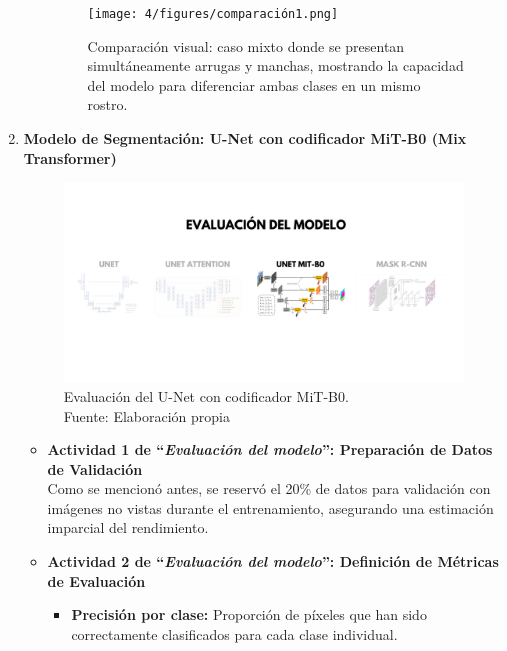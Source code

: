 \begin{enumerate}
\begin{itemize}
\begin{figure}[H]
\centering
\texttt{[image: 4/figures/comparación1.png]}
\caption{Comparación visual: caso mixto donde se presentan simultáneamente arrugas y manchas, mostrando la capacidad del modelo para diferenciar ambas clases en un mismo rostro.}
\label{fig:validacion3}
\end{figure}

  \end{itemize}

  \newpage
  \item \textbf{Modelo de Segmentación: U-Net con codificador MiT-B0 (Mix Transformer)}
  \begin{figure}[H]
	\begin{center}
		\includegraphics[width=1\textwidth]{4/figures/evunetmit.png}
		\caption[Evaluación del U-Net con codificador MiT-B0]{Evaluación del U-Net con codificador MiT-B0.\\
		Fuente: Elaboración propia}
		\label{4:figevunetmit}
	\end{center}
\end{figure}
  \begin{itemize}
  \item\textbf{Actividad 1 de “\textit{Evaluación del modelo}”: Preparación de Datos de Validación}
  \\
  Como se mencionó antes, se reservó el 20\% de datos para validación con imágenes no vistas durante el entrenamiento, asegurando una estimación imparcial del rendimiento.
  
  \item\textbf{Actividad 2 de “\textit{Evaluación del modelo}”: Definición de Métricas de Evaluación}
     \begin{itemize}
  \item \textbf{Precisión por clase:} Proporción de píxeles que han sido correctamente clasificados para cada clase individual.


\end{itemize}
\end{itemize}
\end{enumerate}
